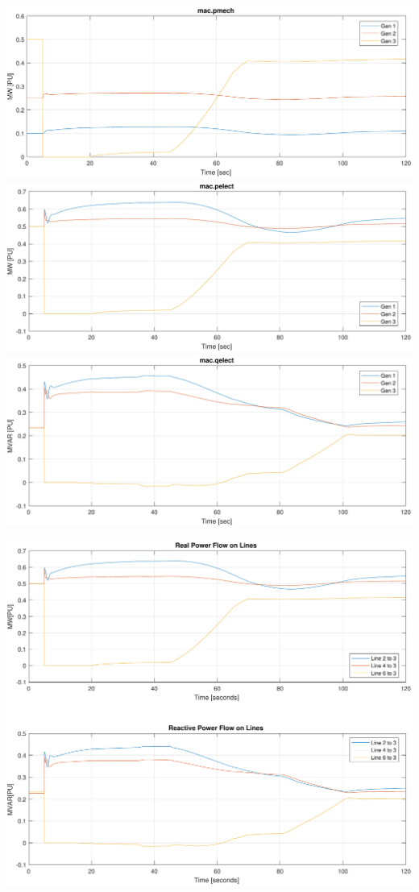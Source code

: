 \documentclass[12pt]{article}
\begin{document}
\pagebreak
\includegraphics[width=\linewidth]{distinctPmech}
\includegraphics[width=\linewidth]{distinctPelect}
\includegraphics[width=\linewidth]{distinctQelect}

\pagebreak
\includegraphics[width=\linewidth]{distinctLoadFlow}
\end{document}
